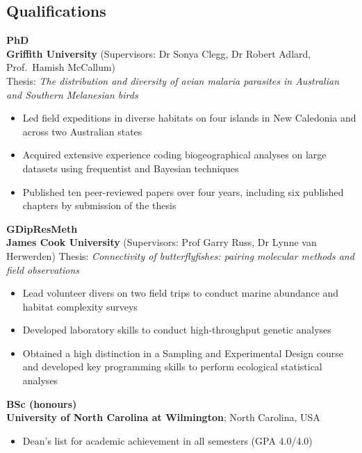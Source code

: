 \documentclass[]{article}
\providecommand{\tightlist}{%
  \setlength{\itemsep}{0pt}\setlength{\parskip}{0pt}}
\begin{document}
\subsection{Qualifications}\label{qualifications}

\textbf{PhD}\\
\textbf{Griffith University} (Supervisors: Dr Sonya Clegg, Dr Robert
Adlard, Prof.~Hamish McCallum)\\
Thesis: \emph{The distribution and diversity of avian malaria parasites
in Australian and Southern Melanesian birds}

\begin{itemize}
\tightlist
\item
  Led field expeditions in diverse habitats on four islands in New
  Caledonia and across two Australian states
\item
  Acquired extensive experience coding biogeographical analyses on large
  datasets using frequentist and Bayesian techniques
\item
  Published ten peer-reviewed papers over four years, including six
  published chapters by submission of the thesis
\end{itemize}

\textbf{GDipResMeth}\\
\textbf{James Cook University} (Supervisors: Prof Garry Russ, Dr Lynne
van Herwerden) Thesis: \emph{Connectivity of butterflyfishes: pairing
molecular methods and field observations}

\begin{itemize}
\tightlist
\item
  Lead volunteer divers on two field trips to conduct marine abundance
  and habitat complexity surveys
\item
  Developed laboratory skills to conduct high-throughput genetic
  analyses
\item
  Obtained a high distinction in a Sampling and Experimental Design
  course and developed key programming skills to perform ecological
  statistical analyses
\end{itemize}

\textbf{BSc (honours)}\\
\textbf{University of North Carolina at Wilmington}; North Carolina, USA

\begin{itemize}
\tightlist
\item
  Dean's list for academic achievement in all semesters (GPA 4.0/4.0)
\end{itemize}
\end{document}
